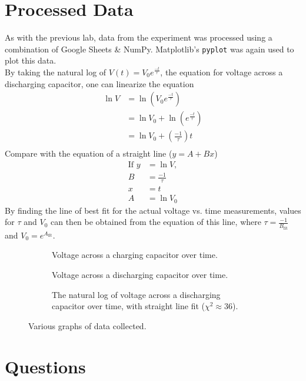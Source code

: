 \documentclass{report}
\begin{document}
\section{Processed Data} \label{dataproc}
	As with the previous lab, data from the experiment was processed using a combination of Google Sheets \& NumPy. Matplotlib's \texttt{pyplot} was again used to plot this data.\\
	By taking the natural log of $V(t)=V_0e^{\frac{-t}{\tau}}$, the equation for voltage across a discharging capacitor, one can linearize the equation
	\begin{align*}
		\ln{V}&=\ln{(V_0e^\frac{-t}{\tau})}\\
		&= \ln{V_0} + \ln{(e^\frac{-t}{\tau})}\\
		&= \ln{V_0} +\left(\frac{-1}{\tau}\right)t\\
	\end{align*}
	Compare with the equation of a straight line ($y=A+Bx$)
	\begin{align*}
		\text{If } y &= \ln{V},\\
		B &= \frac{-1}{\tau}\\
		x &= t\\
		A &= \ln{V_0}
	\end{align*}
	By finding the line of best fit for the actual voltage vs. time measurements, values for $\tau$ and $V_0$ can then be obtained from the equation of this line, where $\tau = \frac{-1}{B_\mathrm{fit}}$ and $V_0 = e^{A_\mathrm{fit}}$.
		\begin{figure}[h]
			\begin{subfigure}{0.3\textwidth}
				
				\caption{Voltage across a charging capacitor over time.}
			\end{subfigure}
			\begin{subfigure}{0.3\textwidth}
				
				\caption{Voltage across a discharging capacitor over time.}
			\end{subfigure}
			\begin{subfigure}{0.3\textwidth}
				
				\caption{The natural log of voltage across a discharging capacitor over time, with straight line fit ($\chi^2 \approx 36$).}
				\label{fit}
			\end{subfigure}
			\caption{Various graphs of data collected.}
		\end{figure}
	
	

\section{Questions}
\end{document}
